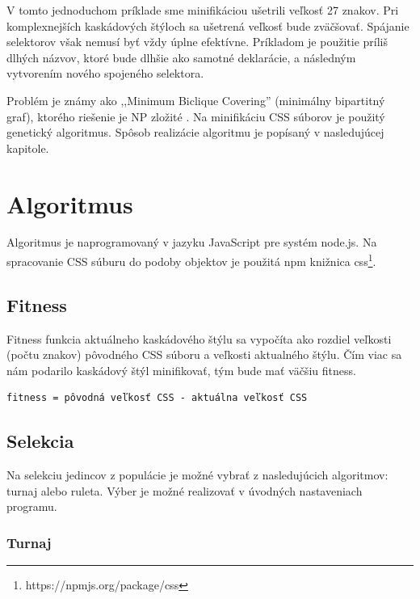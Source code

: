 V tomto jednoduchom príklade sme minifikáciou ušetrili veľkosť 27 znakov. Pri komplexnejších kaskádových štýloch sa ušetrená veľkosť bude zväčšovať. Spájanie selektorov však nemusí byť vždy úplne efektívne. Príkladom je použitie príliš dlhých názvov, ktoré bude dlhšie ako samotné deklarácie, a následným vytvorením nového spojeného selektora.

Problém je známy ako ,,Minimum Biclique Covering'' (minimálny bipartitný graf), ktorého riešenie je NP zložité \cite{orlin, min}. Na minifikáciu CSS súborov je použitý genetický algoritmus. Spôsob realizácie algoritmu je popísaný v nasledujúcej kapitole.


\section{Algoritmus} %
\label{sec:algoritmus}

Algoritmus je naprogramovaný v jazyku JavaScript pre systém node.js. Na spracovanie CSS súburu do podoby objektov je použitá npm knižnica css\footnote{https://npmjs.org/package/css}.

\subsection{Fitness} %
\label{sub:fitness}

Fitness funkcia aktuálneho kaskádového štýlu sa vypočíta ako rozdiel veľkosti (počtu znakov) pôvodného CSS súboru a veľkosti aktualného štýlu. Čím viac sa nám podarilo kaskádový štýl minifikovať, tým bude mať väčšiu fitness.

\begin{verbatim}
fitness = pôvodná veľkosť CSS - aktuálna veľkosť CSS
\end{verbatim}


\subsection{Selekcia} %
\label{sub:selekcia}

Na selekciu jedincov z populácie je možné vybrať z nasledujúcich algoritmov: turnaj alebo ruleta. Výber je možné realizovať v úvodných nastaveniach programu.

\subsubsection{Turnaj} %
\label{ssub:turnaj}

